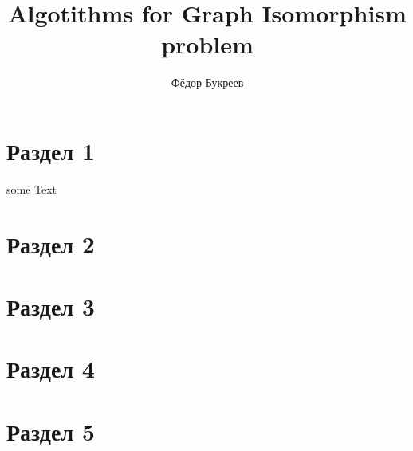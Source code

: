 \documentclass[fleqn]{article}
\title{Algotithms for Graph Isomorphism problem}
\author{Фёдор Букреев}
\begin{document}
\maketitle

\section*{Раздел 1}
some Text
\section*{Раздел 2}

\section*{Раздел 3}

\section*{Раздел 4}

\section*{Раздел 5}
\end{document}
